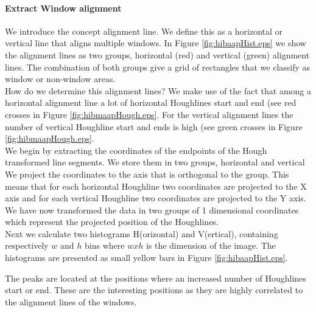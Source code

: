 \paragraph{Extract Window alignment}
We introduce the concept alignment line. We define this as a horizontal or
vertical line that aligns multiple windows. In Figure
\ref{fig:hibaapHist.eps}
we show the alignment lines as two groups, horizontal (red) and
vertical (green) alignment lines.  The combination of both groups give a grid of
rectangles that we classify as window or non-window areas.\\

How do we determine this alignment lines? We make use of the fact that among a
horizontal alignment line a lot of horizontal Houghlines start and end (see red
crosses in Figure \ref{fig:hibmaapHough.eps}. For the vertical alignment lines
the number of vertical Houghline start and ends is high (see green crosses in
Figure \ref{fig:hibmaapHough.eps}.\\

We begin by extracting the coordinates of the endpoints of the Hough transformed line
segments. We store them in two groups, horizontal and vertical%
We project the coordinates to the axis that is orthogonal to the group. This
means that for each horizontal Houghline two coordinates are projected to the X
axis and for each vertical Houghline two coordinates are projected to the Y
axis. We have now transformed the data in two groups of 1 dimensional
coordinates which represent the projected position of the Houghlines.\\

Next we calculate two histograms H(orizontal) and V(ertical), containing respectively
$w$ and $h$ bins where $w x h$ is the dimension of the image.  The histograms
are presented as small yellow bars in Figure \ref{fig:hibaapHist.eps}.

The peaks are located at the positions where an increased number of Houghlines
start or end.  These are the interesting positions as they are highly correlated
to the alignment lines of the windows. 

